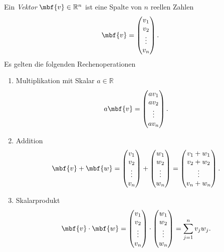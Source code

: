 Ein \emph{Vektor} $\mbf{v}\in \mathbb{R}^n$ ist eine Spalte von $n$ reellen Zahlen
\begin{equation}
	\mbf{v} = 
	\begin{pmatrix}
		v_1 \\ v_2 \\ \vdots \\ v_n
	\end{pmatrix}.
\end{equation}
Es gelten die folgenden Rechenoperationen
\begin{enumerate}
	\item Multiplikation mit Skalar $a\in\mathbb{R}$
	\begin{equation}
		a\mbf{v} = 
	\begin{pmatrix}
		av_1 \\ av_2 \\ \vdots \\ av_n
	\end{pmatrix}.
	\end{equation}
	\item Addition
	\begin{equation}
		\mbf{v}+\mbf{w} = \begin{pmatrix}
		v_1 \\ v_2 \\ \vdots \\ v_n
	\end{pmatrix} + \begin{pmatrix}
		w_1 \\ w_2 \\ \vdots \\ w_n
	\end{pmatrix} =
	\begin{pmatrix}
		v_1+w_1 \\ v_2+w_2 \\ \vdots \\ v_n+w_n
	\end{pmatrix}.
	\end{equation}
	\item Skalarprodukt
	\begin{equation}
		\mbf{v}\cdot\mbf{w} = \begin{pmatrix}
		v_1 \\ v_2 \\ \vdots \\ v_n
	\end{pmatrix} \cdot \begin{pmatrix}
		w_1 \\ w_2 \\ \vdots \\ w_n
	\end{pmatrix} =
	\sum_{j=1}^n v_jw_j.
	\end{equation}
\end{enumerate}

